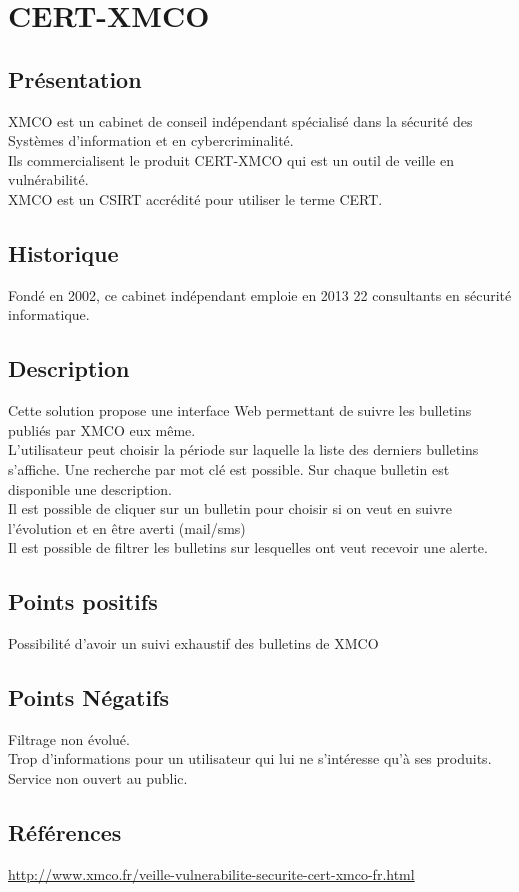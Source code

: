 \section{CERT-XMCO}
\thispagestyle{plain}
\subsection{Présentation}
XMCO est un cabinet de conseil indépendant spécialisé dans la sécurité des Systèmes d’information et en cybercriminalité.\\
Ils commercialisent le produit CERT-XMCO qui est un outil de veille en vulnérabilité.\\
XMCO est un CSIRT accrédité pour utiliser le terme CERT.\\

\subsection{Historique}
Fondé en 2002, ce cabinet indépendant emploie en 2013 22 consultants en sécurité informatique.

\subsection{Description}
Cette solution propose une interface Web permettant de suivre les bulletins publiés par XMCO eux même.\\
L’utilisateur peut choisir la période sur laquelle la liste des derniers bulletins s’affiche. Une recherche par mot clé est possible. Sur chaque bulletin est disponible une description.\\
Il est possible de cliquer sur un bulletin pour choisir si on veut en suivre l’évolution et en être averti (mail/sms)\\
Il est possible de filtrer les bulletins sur lesquelles ont veut recevoir une alerte.\\

\subsection{Points positifs}
Possibilité d’avoir un suivi exhaustif des bulletins de XMCO

\subsection{Points Négatifs}
Filtrage non évolué.\\
Trop d’informations pour un utilisateur qui lui ne s’intéresse qu’à ses produits.\\
Service non ouvert au public.\\

\subsection{Références}
\small
\noindent
\url{http://www.xmco.fr/veille-vulnerabilite-securite-cert-xmco-fr.html}
\normalsize